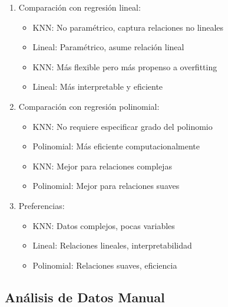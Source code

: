 \documentclass[12pt]{article}
\begin{document}
\begin{enumerate}
    \item Comparación con regresión lineal:
    \begin{itemize}
        \item KNN: No paramétrico, captura relaciones no lineales
        \item Lineal: Paramétrico, asume relación lineal
        \item KNN: Más flexible pero más propenso a overfitting
        \item Lineal: Más interpretable y eficiente
    \end{itemize}
    \item Comparación con regresión polinomial:
    \begin{itemize}
        \item KNN: No requiere especificar grado del polinomio
        \item Polinomial: Más eficiente computacionalmente
        \item KNN: Mejor para relaciones complejas
        \item Polinomial: Mejor para relaciones suaves
    \end{itemize}
    \item Preferencias:
    \begin{itemize}
        \item KNN: Datos complejos, pocas variables
        \item Lineal: Relaciones lineales, interpretabilidad
        \item Polinomial: Relaciones suaves, eficiencia
    \end{itemize}
\end{enumerate}


\subsection{Análisis de Datos Manual}
\end{document}
